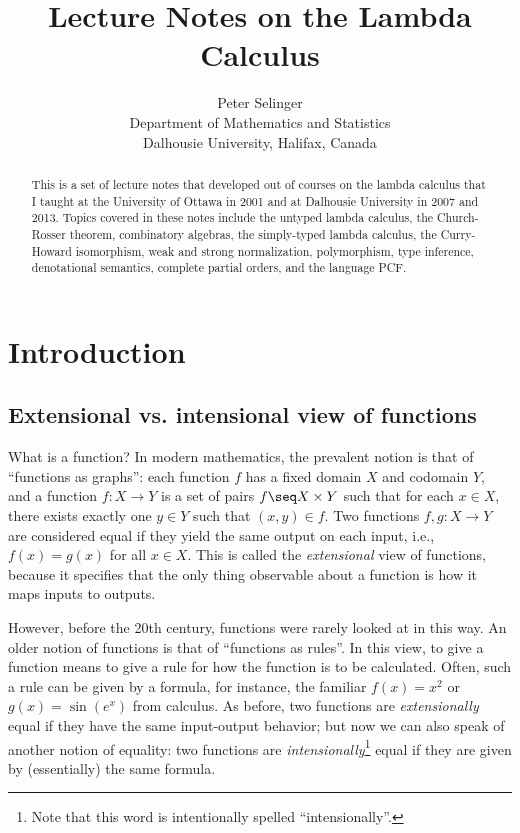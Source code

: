 \documentclass[12pt]{article}
\title{Lecture Notes on the Lambda Calculus}
\author{Peter Selinger\\
Department of Mathematics and Statistics\\
  Dalhousie University, Halifax, Canada}
\date{}
\begin{document}
\maketitle

\begin{abstract}
  This is a set of lecture notes that developed out of courses on the
  lambda calculus that I taught at the University of Ottawa in 2001
  and at Dalhousie University in 2007 and 2013. Topics covered in
  these notes include the untyped lambda calculus, the Church-Rosser
  theorem, combinatory algebras, the simply-typed lambda calculus, the
  Curry-Howard isomorphism, weak and strong normalization,
  polymorphism, type inference, denotational semantics, complete
  partial orders, and the language PCF.
\end{abstract}

\newpage

\tableofcontents

\newpage

\section{Introduction}\label{sec-intro}

\subsection{Extensional vs. intensional view of functions}
\label{subsec-intro1}

What is a function? In modern mathematics, the prevalent notion is
that of ``functions as graphs'': each function $f$ has a fixed domain
$X$ and codomain $Y$, and a function $f:X\to Y$ is a set of pairs
$f\seq X\times Y$ such that for each $x\in X$, there exists exactly
one $y\in Y$ such that $(x,y)\in f$. Two functions $f,g:X\to Y$ are
considered equal if they yield the same output on each input, i.e.,
$f(x)=g(x)$ for all $x\in X$. This is called the {\em extensional}
view of functions, because it specifies that the only thing observable
about a function is how it maps inputs to outputs.

However, before the 20th century, functions were rarely looked at in
this way. An older notion of functions is that of ``functions as
rules''. In this view, to give a function means to give a rule for how
the function is to be calculated. Often, such a rule can be given by a
formula, for instance, the familiar $f(x)=x^2$ or $g(x)=\sin(e^x)$
from calculus. As before, two functions are {\em extensionally} equal
if they have the same input-output behavior; but now we can also speak
of another notion of equality: two functions are {\em
  intensionally}\footnote{Note that this word is intentionally spelled
  ``intensionally''.}  equal if they are given by (essentially) the
same formula.
\end{document}
